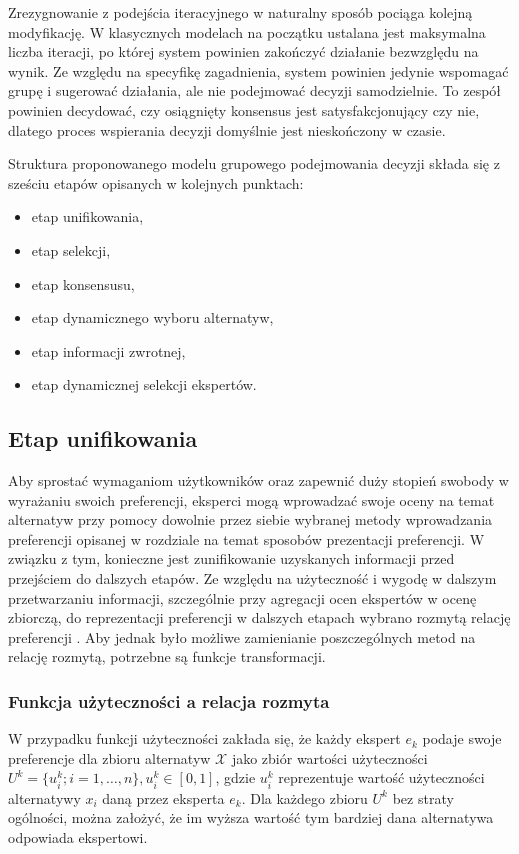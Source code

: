 Zrezygnowanie z podejścia iteracyjnego w naturalny sposób pociąga kolejną
modyfikację. W klasycznych modelach na początku ustalana jest maksymalna liczba
iteracji, po której system powinien zakończyć działanie bezwzględu na wynik.
Ze względu na specyfikę zagadnienia, system powinien jedynie wspomagać grupę i
sugerować działania, ale nie podejmować decyzji samodzielnie. To zespół powinien
decydować, czy osiągnięty konsensus jest satysfakcjonujący czy nie, dlatego
proces wspierania decyzji domyślnie jest nieskończony w czasie.

Struktura proponowanego modelu grupowego podejmowania decyzji składa się z
sześciu etapów opisanych w kolejnych punktach:
\begin{itemize}
  \item etap unifikowania,
  \item etap selekcji,
  \item etap konsensusu,
  \item etap dynamicznego wyboru alternatyw,
  \item etap informacji zwrotnej,
  \item etap dynamicznej selekcji ekspertów.
\end{itemize}


\subsection{Etap unifikowania}
Aby sprostać wymaganiom użytkowników oraz zapewnić duży stopień swobody w
wyrażaniu swoich preferencji, eksperci mogą wprowadzać swoje oceny na temat
alternatyw przy pomocy dowolnie przez siebie wybranej metody wprowadzania
preferencji opisanej w rozdziale na temat sposobów prezentacji preferencji. W
związku z tym, konieczne jest zunifikowanie uzyskanych informacji przed
przejściem do dalszych etapów. Ze względu na użyteczność i wygodę w dalszym
przetwarzaniu informacji, szczególnie przy agregacji ocen ekspertów w ocenę
zbiorczą, do reprezentacji preferencji w dalszych etapach wybrano rozmytą
relację preferencji \cite{Ma2006}. Aby jednak było możliwe zamienianie
poszczególnych metod na relację rozmytą, potrzebne są funkcje transformacji.

\subsubsection{Funkcja użyteczności a relacja rozmyta}
W przypadku funkcji użyteczności zakłada się, że każdy ekspert $e_k$ podaje
swoje preferencje dla zbioru alternatyw $\mathcal{X}$ jako zbiór wartości
użyteczności $U^k = \{ u^k_i; i=1,\dotsc,n\}, u^k_i \in [0,1]$, gdzie
$u^k_i$ reprezentuje wartość użyteczności alternatywy $x_i$ daną przez eksperta
$e_k$. Dla każdego zbioru $U^k$ bez straty ogólności, można założyć, że im
wyższa wartość tym bardziej dana alternatywa odpowiada ekspertowi.


